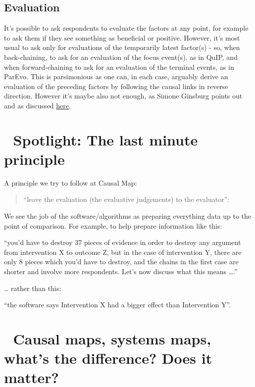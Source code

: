 \documentclass[
]{book}
\begin{document}
\hypertarget{evaluation}{%
\section{Evaluation}\label{evaluation}}

It's possible to ask respondents to evaluate the factors at any point, for example to ask them if they see something as beneficial or positive. However, it's most usual to ask only for evaluations of the temporarily latest factor(s) - so, when back-chaining, to ask for an evaluation of the focus event(s), as in QuIP, and when forward-chaining to ask for an evaluation of the terminal events, as in ParEvo. This is parsimonious as one can, in each case, arguably derive an evaluation of the preceding factors by following the causal links in reverse direction. However it's maybe also not enough, as Simone Ginsburg points out and as discussed \href{https://journals.sfu.ca/jmde/index.php/jmde_1/article/view/563}{here}.

\hypertarget{spotlight-the-last-minute-principle}{%
\chapter{🧠 Spotlight: The last minute principle}\label{spotlight-the-last-minute-principle}}

A principle we try to follow at Causal Map:

\begin{quote}
``leave the evaluation (the evaluative judgements) to the evaluator'':
\end{quote}

We see the job of the software/algorithms as preparing everything data up to the point of comparison. For example, to help prepare information like this:

``you'd have to destroy 37 pieces of evidence in order to destroy any argument from intervention X to outcome Z, but in the case of intervention Y, there are only 8 pieces which you'd have to destroy, and the chains in the first case are shorter and involve more respondents. Let's now discuss what this means \ldots.''

\ldots{} rather than this:

``the software says Intervention X had a bigger effect than Intervention Y''.

\hypertarget{causal-maps-systems-maps-whats-the-difference-does-it-matter}{%
\chapter{🧠 Causal maps, systems maps, what's the difference? Does it matter?}\label{causal-maps-systems-maps-whats-the-difference-does-it-matter}}
\end{document}
